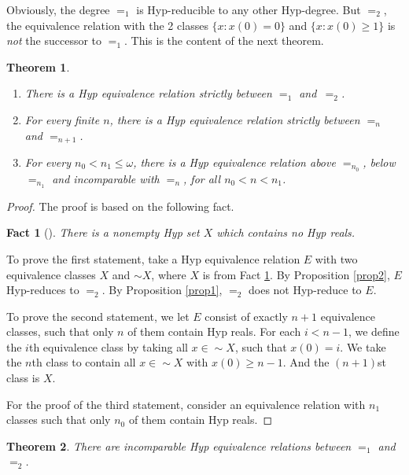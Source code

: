 \documentclass[11pt, english]{article}
\newtheorem{thm}{Theorem}
\newtheorem{cor}{Corollary}
\newtheorem{fact}{Fact}
\begin{document}

Obviously, the degree $=_1$ is Hyp-reducible to any other
Hyp-degree. But $=_2$, the equivalence relation with the 2 classes
$\{x:x(0)=0\}$ and $\{x:x(0)\geq 1\}$ is \emph{not} the successor to
$=_1$. This is the content of the next theorem.

\begin{thm}\label{Thm1-2}
\begin{enumerate}
 \item There is a Hyp equivalence relation strictly between $=_1$ and~$=_2$.
 \item For every finite $n$, there is a Hyp equivalence relation strictly between $=_n$ and $=_{n+1}$.
 \item For every $n_0<n_1\leq\omega$, there is a Hyp equivalence relation above $=_{n_0}$, below $=_{n_1}$ and incomparable with $=_n$, for all $n_0<n<n_1$.
\end{enumerate}

\end{thm}

\begin{proof} The proof is based on the following fact.
\begin{fact}[\cite{Sacks}]\label{HNH}
There is a nonempty Hyp set $X$ which contains no Hyp reals.
\end{fact}

To prove the first statement, take a Hyp equivalence relation $E$
with two equivalence classes $X$ and $\sim X$, where $X$ is from
Fact \ref{HNH}. By Proposition \ref{prop2}, $E$ Hyp-reduces to
$=_2$. By Proposition \ref{prop1}, $=_2$ does not Hyp-reduce to $E$.

To prove the second statement, we let $E$ consist of exactly $n+1$
equivalence classes, such that only $n$ of them contain Hyp reals.
For each $i< n-1$, we define the $i$th equivalence class by taking
all $x\in\sim X$, such that $x(0)=i$. We take the $n$th class to
contain all $x\in\sim X$ with $x(0)\geq n-1$. And the $(n+1)$st
class is $X$.

For the proof of the third statement, consider an equivalence
relation with $n_1$ classes such that only $n_0$ of them contain Hyp
reals.
\end{proof}

\begin{thm}
There are incomparable Hyp equivalence relations between $=_1$ and
$=_2$.
\end{thm}
\end{document}
